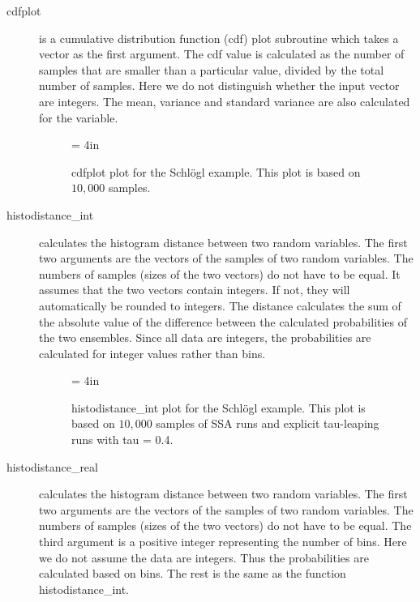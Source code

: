 \documentclass[12pt]{article}
\begin{document}
\begin{description}
\item[cdfplot] is a cumulative distribution function (cdf) plot subroutine which takes a vector as the
first argument. The cdf value is calculated as the number of samples that are smaller than a
particular value, divided by the total number of samples. Here we do not distinguish whether the input
vector are integers. The mean, variance and standard variance are
also calculated for the variable.

\begin{figure}
\begin{center}
\epsfxsize = 4in
\caption{   \label{schloglcdf}
cdfplot plot for the Schl\"ogl example. This plot is based on $10,000$ samples. }
\end{center}
\end{figure}

\item[histodistance\_int] calculates the histogram distance between two random variables. The first two
arguments are the vectors of the samples of two random variables. The numbers of samples (sizes of
the two vectors) do not have to be equal. It assumes that the two vectors contain integers. If not,
they will automatically be rounded to integers. The distance calculates the sum of the absolute value
of the difference between the calculated probabilities of the two ensembles. Since all data are integers,
the probabilities are calculated for integer values rather than bins.

\begin{figure}
\begin{center}
\epsfxsize = 4in
\caption{   \label{schloglintdistance}
histodistance\_int plot for the Schl\"ogl example. This plot is based on
$10,000$ samples of SSA runs and
explicit tau-leaping runs with tau = 0.4. }
\end{center}
\end{figure}

\item[histodistance\_real] calculates the histogram distance between two random variables. The first two
arguments are the vectors of the samples of two random variables. The numbers of samples (sizes of
the two vectors) do not have to be equal.
The third argument is a positive integer representing the number of bins.
Here we do not assume the data are integers. Thus the probabilities are calculated based on bins.
The rest is the same as the function histodistance\_int.


\end{description}
\end{document}
